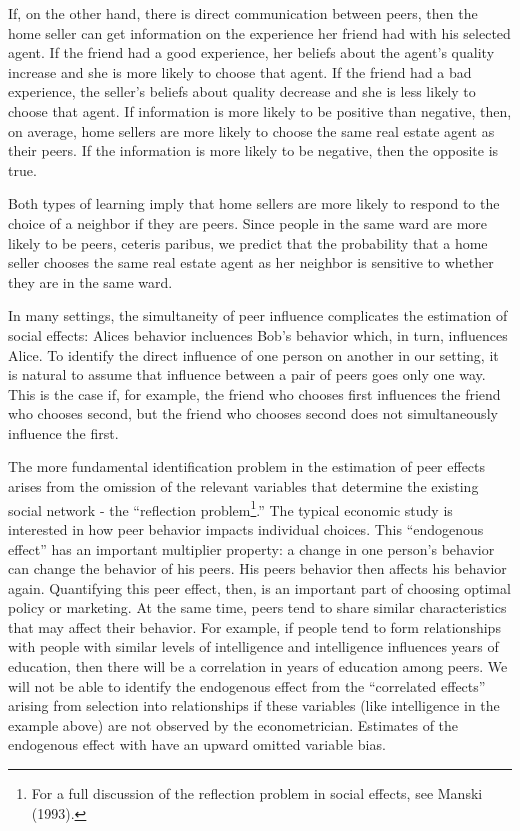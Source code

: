 \documentclass[12pt]{article}
\begin{document}
    If, on the other hand, there is direct communication between peers, then the home seller can get information on the experience her friend had with
    his selected agent. If the friend had a good experience, her beliefs about the agent's quality increase and she is more likely to choose that
    agent. If the friend had a bad experience, the seller's beliefs about quality decrease and she is less likely to choose that agent. If information
    is more likely to be positive than negative, then, on average, home sellers are more likely to choose the same real estate agent as their peers.
    If the information is more likely to be negative, then the opposite is true. 

    Both types of learning imply that home sellers are more likely to respond to the choice of a neighbor if they are peers. Since people in
    the same ward are more likely to be peers, ceteris paribus, we predict that the probability that a home seller chooses the same real estate agent
    as her neighbor is sensitive to whether they are in the same ward.
    
    In many settings, the simultaneity of peer influence complicates the estimation of social effects: Alices behavior incluences Bob's behavior
    which, in turn, influences Alice. To identify the direct influence of one person on another in our setting, it is natural to assume that influence
    between a pair of peers goes only one way.  This is the case if, for example, the friend who chooses first influences the friend who chooses
    second, but the friend who chooses second does not simultaneously influence the first.

    The more fundamental identification problem in the estimation of peer effects arises from the omission of the relevant variables that determine
    the existing social network - the ``reflection problem\footnote{For a full discussion of the reflection problem in social effects, see Manski
    (1993).}.''
    The typical economic study is interested in how peer behavior impacts individual choices. This ``endogenous effect'' has an important multiplier
    property: a change in one person's behavior can change the behavior of his peers. His peers behavior then affects his behavior again.
    Quantifying this peer effect, then, is an important part of choosing optimal policy or marketing. At the same time, peers tend to share similar
    characteristics that may affect their behavior. For example, if people tend to form relationships with people with similar levels of intelligence
    and intelligence influences years of education, then there will be a correlation in years of education among peers.  We will not be able to
    identify the endogenous effect from the ``correlated effects'' arising from selection into relationships if these variables (like intelligence in
    the example above) are not observed by the econometrician. Estimates of the endogenous effect with have an upward omitted variable bias. 
\end{document}
